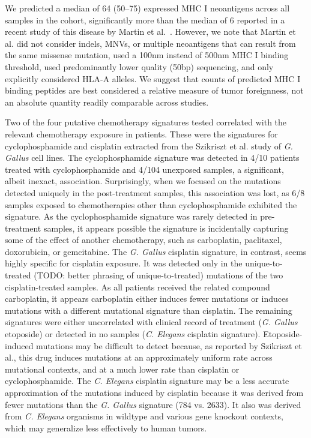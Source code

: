We predicted a median of 64 (50--75) expressed MHC I neoantigens across all samples in the cohort, significantly more than the median of 6 reported in a recent study of this disease by Martin et al.~\cite{Martin_2016}. However, we note that Martin et al. did not consider indels, MNVs, or multiple neoantigens that can result from the same missense mutation, used a 100nm instead of 500nm MHC I binding threshold, used predominantly lower quality (50bp) sequencing, and only explicitly considered HLA-A alleles. We suggest that counts of predicted MHC I binding peptides are best considered a relative measure of tumor foreignness, not an absolute quantity readily comparable across studies.

Two of the four putative chemotherapy signatures tested correlated with the relevant chemotherapy exposure in patients. These were the signatures for cyclophosphamide and cisplatin extracted from the Szikriszt et al. study of \textit{G. Gallus} cell lines. The cyclophosphamide signature was detected in 4/10 patients treated with cyclophosphamide and 4/104 unexposed samples, a significant, albeit inexact, association. Surprisingly, when we focused on the mutations detected uniquely in the post-treatment samples, this association was lost, as 6/8 samples exposed to chemotherapies other than cyclophosphamide exhibited the signature. As the cyclophosphamide signature was rarely detected in pre-treatment samples, it appears possible the signature is incidentally capturing some of the effect of another chemotherapy, such as carboplatin, paclitaxel, doxorubicin, or gemcitabine. The \textit{G. Gallus} cisplatin signature, in contrast, seems highly specific for cisplatin exposure. It was detected only in the unique-to-treated (TODO: better phrasing of unique-to-treated) mutations of the two cisplatin-treated samples. As all patients received the related compound carboplatin, it appears carboplatin either induces fewer mutations or induces mutations with a different mutational signature than cisplatin. The remaining signatures were either uncorrelated with clinical record of treatment (\textit{G. Gallus} etoposide) or detected in no samples (\textit{C. Elegans} cisplatin signature). Etoposide-induced mutations may be difficult to detect because, as reported by Szikriszt et al., this drug induces mutations at an approximately uniform rate across mutational contexts, and at a much lower rate than cisplatin or cyclophosphamide. The \textit{C. Elegans} cisplatin signature may be a less accurate approximation of the mutations induced by cisplatin because it was derived from fewer mutations than the \textit{G. Gallus} signature (784 vs. 2633). It also was derived from \textit{C. Elegans} organisms in wildtype and various gene knockout contexts, which may generalize less effectively to human tumors.

